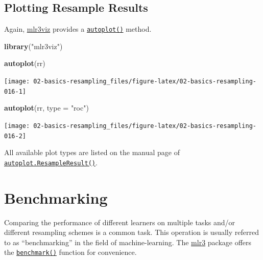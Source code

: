 \documentclass[]{scrbook}
\newenvironment{Shaded}{\begin{snugshade}}{\end{snugshade}}
\newcommand{\DataTypeTok}[1]{\textcolor[rgb]{0.13,0.29,0.53}{#1}}
\newcommand{\KeywordTok}[1]{\textcolor[rgb]{0.13,0.29,0.53}{\textbf{#1}}}
\newcommand{\NormalTok}[1]{#1}
\newcommand{\StringTok}[1]{\textcolor[rgb]{0.31,0.60,0.02}{#1}}
\renewenvironment{Shaded} {\begin{snugshade}\small} {\end{snugshade}}
\begin{document}
\hypertarget{autoplot-resampleresult}{%
\subsection{Plotting Resample Results}\label{autoplot-resampleresult}}

Again, \href{https://mlr3viz.mlr-org.com}{mlr3viz} provides a \href{https://www.rdocumentation.org/packages/ggplot2/topics/autoplot}{\texttt{autoplot()}} method.

\begin{Shaded}
\begin{Highlighting}[]
\KeywordTok{library}\NormalTok{(}\StringTok{"mlr3viz"}\NormalTok{)}

\KeywordTok{autoplot}\NormalTok{(rr)}
\end{Highlighting}
\end{Shaded}

\begin{center}\texttt{[image: 02-basics-resampling\_files/figure-latex/02-basics-resampling-016-1]} \end{center}

\begin{Shaded}
\begin{Highlighting}[]
\KeywordTok{autoplot}\NormalTok{(rr, }\DataTypeTok{type =} \StringTok{"roc"}\NormalTok{)}
\end{Highlighting}
\end{Shaded}

\begin{center}\texttt{[image: 02-basics-resampling\_files/figure-latex/02-basics-resampling-016-2]} \end{center}

All available plot types are listed on the manual page of \href{https://mlr3viz.mlr-org.com/reference/autoplot.ResampleResult.html}{\texttt{autoplot.ResampleResult()}}.

\hypertarget{benchmarking}{%
\section{Benchmarking}\label{benchmarking}}

Comparing the performance of different learners on multiple tasks and/or different resampling schemes is a common task.
This operation is usually referred to as ``benchmarking'' in the field of machine-learning.
The \href{https://mlr3.mlr-org.com}{mlr3} package offers the \href{https://mlr3.mlr-org.com/reference/benchmark.html}{\texttt{benchmark()}} function for convenience.
\end{document}
